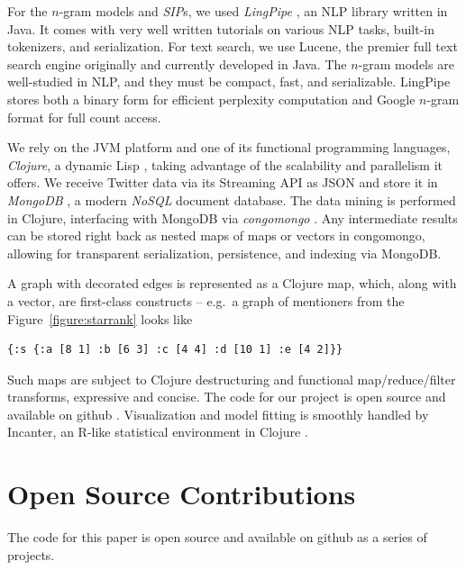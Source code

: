\documentclass[10pt,oneside]{memoir}
\begin{document}
For the $n$-gram models and {\itshape SIP}s, we used {\itshape LingPipe} \cite{code:lingpipe}, an NLP library written in Java. It comes with very well written tutorials on various NLP tasks, built-in tokenizers, and serialization. For text search, we use Lucene, the premier full text search engine originally and currently developed in Java. The $n$-gram models are well-studied in NLP, and they must be compact, fast, and serializable. LingPipe stores both a binary form for efficient perplexity computation and Google $n$-gram format for full count access.


We rely on the JVM platform and one of its functional programming languages, \emph{Clojure}, a dynamic Lisp \cite{code:clojure}, taking advantage of the scalability and parallelism it offers.  We receive Twitter data via its Streaming API as JSON and store it in \emph{MongoDB} \cite{code:mongodb}, a modern \emph{NoSQL} document database.  The data mining is performed in Clojure, interfacing with MongoDB via \emph{congomongo} \cite{code:congomongo}.  Any intermediate results can be stored right back as nested maps of maps or vectors in congomongo, allowing for transparent serialization, persistence, and indexing via MongoDB.  


A graph with decorated edges is represented as a Clojure map, which, along with a vector, are first-class constructs -- e.g.\ a graph of mentioners from the Figure~\ref{figure:starrank} looks like 



{\footnotesize
\begin{verbatim}
{:s {:a [8 1] :b [6 3] :c [4 4] :d [10 1] :e [4 2]}}    
\end{verbatim}
}
Such maps are subject to Clojure destructuring and functional map/reduce/filter transforms, expressive and concise.  The code for our project is open source and available on github \cite{code:mongol}.  Visualization and model fitting is smoothly handled by Incanter, an R-like statistical environment in Clojure \cite{code:incanter}.


\pagebreak \section{Open Source Contributions}
\label{opensourcecontributions}

The code for this paper is open source and available on github as a series of projects.
\end{document}
